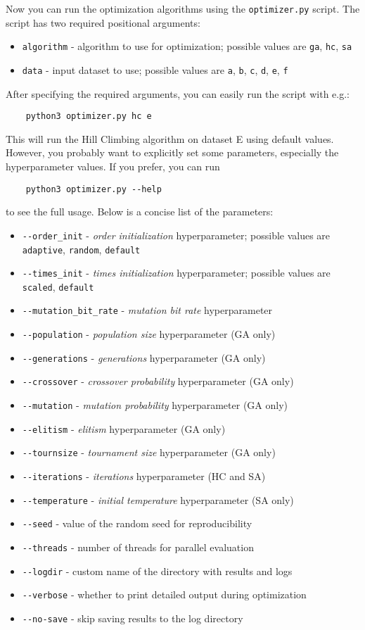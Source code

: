 Now you can run the optimization algorithms using the \verb|optimizer.py| script. The script has two required positional arguments:
\begin{itemize}
    \item \verb|algorithm| - algorithm to use for optimization; possible values are \verb|ga|, \verb|hc|, \verb|sa|
    \item \verb|data| - input dataset to use; possible values are \verb|a|, \verb|b|, \verb|c|, \verb|d|, \verb|e|, \verb|f|
\end{itemize}
After specifying the required arguments, you can easily run the script with e.g.:
\begin{verbatim}
    python3 optimizer.py hc e
\end{verbatim}
This will run the Hill Climbing algorithm on dataset E using default values. However, you probably want to explicitly set some parameters, especially the hyperparameter values. If you prefer, you can run
\begin{verbatim}
    python3 optimizer.py --help
\end{verbatim}
to see the full usage. Below is a concise list of the parameters:
\begin{itemize}
    \item \verb|--order_init| - \textit{order initialization} hyperparameter; possible values are \verb|adaptive|, \verb|random|, \verb|default|
    \item \verb|--times_init| - \textit{times initialization} hyperparameter; possible values are \verb|scaled|, \verb|default|
    \item \verb|--mutation_bit_rate| - \textit{mutation bit rate} hyperparameter
    \item \verb|--population| - \textit{population size} hyperparameter (GA only)
    \item \verb|--generations| - \textit{generations} hyperparameter (GA only)
    \item \verb|--crossover| - \textit{crossover probability} hyperparameter (GA only)
    \item \verb|--mutation| - \textit{mutation probability} hyperparameter (GA only)
    \item \verb|--elitism| - \textit{elitism} hyperparameter (GA only)
    \item \verb|--tournsize| - \textit{tournament size} hyperparameter (GA only)
    \item \verb|--iterations| - \textit{iterations} hyperparameter (HC and SA)
    \item \verb|--temperature| - \textit{initial temperature} hyperparameter (SA only)
    \item \verb|--seed| - value of the random seed for reproducibility
    \item \verb|--threads| - number of threads for parallel evaluation
    \item \verb|--logdir| - custom name of the directory with results and logs
    \item \verb|--verbose| - whether to print detailed output during optimization
    \item \verb|--no-save| - skip saving results to the log directory
\end{itemize}
